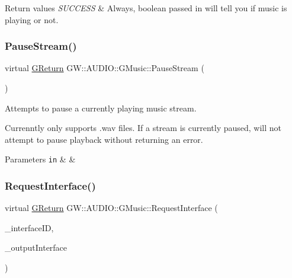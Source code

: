 \begin{DoxyRetVals}{Return values}
{\em S\+U\+C\+C\+E\+SS} & Always, boolean passed in will tell you if music is playing or not. \\
\hline
\end{DoxyRetVals}
\mbox{\label{classGW_1_1AUDIO_1_1GMusic_a6a7a4efcf2d54bcf53429cedd7687e73}} 
\subsubsection{\texorpdfstring{Pause\+Stream()}{PauseStream()}}
{\footnotesize\ttfamily virtual \hyperlink{namespaceGW_a67a839e3df7ea8a5c5686613a7a3de21}{G\+Return} G\+W\+::\+A\+U\+D\+I\+O\+::\+G\+Music\+::\+Pause\+Stream (\begin{DoxyParamCaption}{ }\end{DoxyParamCaption})\hspace{0.3cm}{\ttfamily [pure virtual]}}



Attempts to pause a currently playing music stream. 

Currenntly only supports .wav files. If a stream is currently paused, will not attempt to pause playback without returning an error.


\begin{DoxyParams}[1]{Parameters}
\mbox{\tt in}  & {\em } & \\
\hline
\end{DoxyParams}
\mbox{\label{classGW_1_1AUDIO_1_1GMusic_a45b07d7915cfe61ab27338c42b78dcfb}} 
\subsubsection{\texorpdfstring{Request\+Interface()}{RequestInterface()}}
{\footnotesize\ttfamily virtual \hyperlink{namespaceGW_a67a839e3df7ea8a5c5686613a7a3de21}{G\+Return} G\+W\+::\+A\+U\+D\+I\+O\+::\+G\+Music\+::\+Request\+Interface (\begin{DoxyParamCaption}\item[{const \hyperlink{structGW_1_1GUUIID}{G\+U\+U\+I\+ID} \&}]{\+\_\+interface\+ID,  }\item[{void $\ast$$\ast$}]{\+\_\+output\+Interface }\end{DoxyParamCaption})\hspace{0.3cm}{\ttfamily [pure virtual]}}



